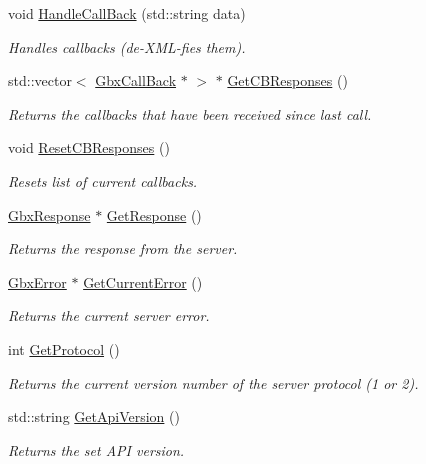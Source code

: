 \begin{DoxyCompactItemize}
void \hyperlink{classGbxRemote_a5bd6e1dc2118f7e369e72592b3c9322a}{Handle\-Call\-Back} (std\-::string data)
\begin{DoxyCompactList}\small\item\em Handles callbacks (de-\/\-X\-M\-L-\/fies them). \end{DoxyCompactList}\item 
std\-::vector$<$ \hyperlink{classGbxCallBack}{Gbx\-Call\-Back} $\ast$ $>$ $\ast$ \hyperlink{classGbxRemote_aaf03cc4c57ec402c91727ee2941814df}{Get\-C\-B\-Responses} ()
\begin{DoxyCompactList}\small\item\em Returns the callbacks that have been received since last call. \end{DoxyCompactList}\item 
void \hyperlink{classGbxRemote_a81ba62f042948610a3cf720316e22076}{Reset\-C\-B\-Responses} ()
\begin{DoxyCompactList}\small\item\em Resets list of current callbacks. \end{DoxyCompactList}\item 
\hyperlink{classGbxResponse}{Gbx\-Response} $\ast$ \hyperlink{classGbxRemote_adac67444e391ffcc1dfda8f087eaef0b}{Get\-Response} ()
\begin{DoxyCompactList}\small\item\em Returns the response from the server. \end{DoxyCompactList}\item 
\hyperlink{structGbxError}{Gbx\-Error} $\ast$ \hyperlink{classGbxRemote_a5467b5400129cd13239f88576aaaa2b4}{Get\-Current\-Error} ()
\begin{DoxyCompactList}\small\item\em Returns the current server error. \end{DoxyCompactList}\item 
int \hyperlink{classGbxRemote_ae6e15060920a31482fd14045cfd42803}{Get\-Protocol} ()
\begin{DoxyCompactList}\small\item\em Returns the current version number of the server protocol (1 or 2). \end{DoxyCompactList}\item 
std\-::string \hyperlink{classGbxRemote_a6351f71fe649bff2aabfbd9b7c89e3f5}{Get\-Api\-Version} ()
\begin{DoxyCompactList}\small\item\em Returns the set A\-P\-I version. \end{DoxyCompactList}\end{DoxyCompactItemize}
